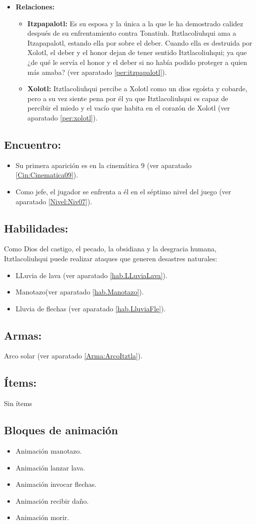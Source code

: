 \begin{itemize}
	\item \textbf{Relaciones:}
	\begin{itemize}
		\item \textbf{Itzpapalotl:} Es su esposa y la única a la que le ha demostrado calidez después de su enfrentamiento contra Tonatiuh. Itztlacoliuhqui ama a Itzapapalotl, estando ella por sobre el deber. Cuando ella es destruida por Xolotl, el deber y el honor dejan de tener sentido Itztlacoliuhqui; ya que ¿de qué le servía el honor y el deber si no había podido proteger a quien más amaba? (ver aparatado \ref{per:itzpapalotl}).
		\item \textbf{Xolotl: } Itztlacoliuhqui percibe a Xolotl como un dios egoísta y cobarde, pero a su vez siente pena por él ya que Itztlacoliuhqui es capaz de percibir el miedo y el vacío que habita en el corazón de Xolotl (ver aparatado \ref{per:xolotl}). 
	\end{itemize}			  
\end{itemize}

\subsection{Encuentro:}
\begin{itemize}
	\item Su primera aparición es en la cinemática 9 (ver aparatado \ref{Cin:Cinematica09}).
	\item Como jefe, el jugador se enfrenta a él en el séptimo nivel del juego (ver aparatado \ref{Nivel:Niv07}).
\end{itemize} 

\subsection{Habilidades:}
Como Dios del castigo, el pecado, la obsidiana y la desgracia humana, Itztlacoliuhqui puede realizar ataques que generen desastres naturales:
\begin{itemize}
	\item LLuvia de lava (ver aparatado \ref{hab.LLuviaLava}).
	\item Manotazo(ver aparatado \ref{hab.Manotazo}).
	\item Lluvia de flechas (ver aparatado \ref{hab.LluviaFle}). 
\end{itemize}
\subsection{Armas:}
Arco solar (ver aparatado \ref{Arma:ArcoItztla}). 
\subsection{Ítems:}
Sin ítems
\subsection{Bloques de animación}
	\begin{itemize}
		\item Animación manotazo.
		\item Animación lanzar lava.
		\item Animación invocar flechas.
		\item Animación recibir daño.
		\item Animación morir.
	\end{itemize}